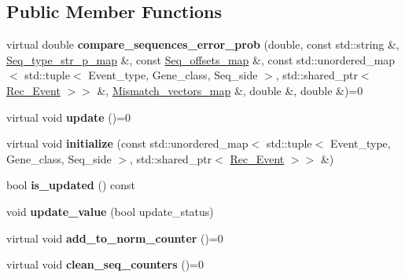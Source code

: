 \subsection*{Public Member Functions}
\begin{DoxyCompactItemize}
\item 
\mbox{\label{classError__rate_a85ce800379f3365e1f1e40d0ad4f27d6}} 
virtual double {\bfseries compare\+\_\+sequences\+\_\+error\+\_\+prob} (double, const std\+::string \&, \hyperlink{classEnum__fast__memory__map}{Seq\+\_\+type\+\_\+str\+\_\+p\+\_\+map} \&, const \hyperlink{classEnum__fast__memory__dual__key__map}{Seq\+\_\+offsets\+\_\+map} \&, const std\+::unordered\+\_\+map$<$ std\+::tuple$<$ Event\+\_\+type, Gene\+\_\+class, Seq\+\_\+side $>$, std\+::shared\+\_\+ptr$<$ \hyperlink{classRec__Event}{Rec\+\_\+\+Event} $>$$>$ \&, \hyperlink{classEnum__fast__memory__map}{Mismatch\+\_\+vectors\+\_\+map} \&, double \&, double \&)=0
\item 
\mbox{\label{classError__rate_abda427d21d09f851fc6a497abf0e0d41}} 
virtual void {\bfseries update} ()=0
\item 
\mbox{\label{classError__rate_a1fbed484799dacb10510628f2a107e7e}} 
virtual void {\bfseries initialize} (const std\+::unordered\+\_\+map$<$ std\+::tuple$<$ Event\+\_\+type, Gene\+\_\+class, Seq\+\_\+side $>$, std\+::shared\+\_\+ptr$<$ \hyperlink{classRec__Event}{Rec\+\_\+\+Event} $>$$>$ \&)
\item 
\mbox{\label{classError__rate_a59c2011cf8eb4a79ab9d4560c1cdc3c6}} 
bool {\bfseries is\+\_\+updated} () const
\item 
\mbox{\label{classError__rate_ac4aa825ecaa851b880c2e6094c1eb0fd}} 
void {\bfseries update\+\_\+value} (bool update\+\_\+status)
\item 
\mbox{\label{classError__rate_a565ac6d0924f7fe4321cd0a0ef802825}} 
virtual void {\bfseries add\+\_\+to\+\_\+norm\+\_\+counter} ()=0
\item 
\mbox{\label{classError__rate_ae481534229fc21de79b66d8edcc17d62}} 
virtual void {\bfseries clean\+\_\+seq\+\_\+counters} ()=0
\item 

\end{DoxyCompactItemize}
